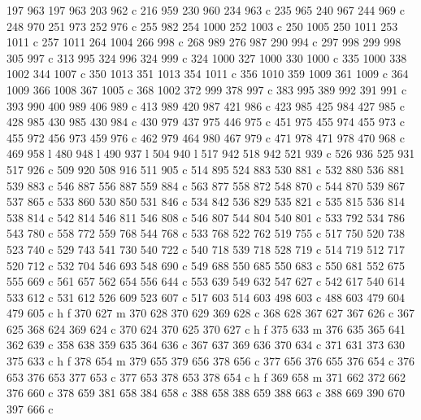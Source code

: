 {{        197 963 197 963 203 962 c
        216 959 230 960 234 963 c
        235 965 240 967 244 969 c
        248 970 251 973 252 976 c
        255 982 254 1000 252 1003 c
        250 1005 250 1011 253 1011 c
        257 1011 264 1004 266 998 c
        268 989 276 987 290 994 c
        297 998 299 998 305 997 c
        313 995 324 996 324 999 c
        324 1000 327 1000 330 1000 c
        335 1000 338 1002 344 1007 c
        350 1013 351 1013 354 1011 c
        356 1010 359 1009 361 1009 c
        364 1009 366 1008 367 1005 c
        368 1002 372 999 378 997 c
        383 995 389 992 391 991 c
        393 990 400 989 406 989 c
        413 989 420 987 421 986 c
        423 985 425 984 427 985 c
        428 985 430 985 430 984 c
        430 979 437 975 446 975 c
        451 975 455 974 455 973 c
        455 972 456 973 459 976 c
        462 979 464 980 467 979 c
        471 978 471 978 470 968 c
        469 958 l
        480 948 l
        490 937 l
        504 940 l
        517 942 518 942 521 939 c
        526 936 525 931 517 926 c
        509 920 508 916 511 905 c
        514 895 524 883 530 881 c
        532 880 536 881 539 883 c
        546 887 556 887 559 884 c
        563 877 558 872 548 870 c
        544 870 539 867 537 865 c
        533 860 530 850 531 846 c
        534 842 536 829 535 821 c
        535 815 536 814 538 814 c
        542 814 546 811 546 808 c
        546 807 544 804 540 801 c
        533 792 534 786 543 780 c
        558 772 559 768 544 768 c
        533 768 522 762 519 755 c
        517 750 520 738 523 740 c
        529 743 541 730 540 722 c
        540 718 539 718 528 719 c
        514 719 512 717 520 712 c
        532 704 546 693 548 690 c
        549 688 550 685 550 683 c
        550 681 552 675 555 669 c
        561 657 562 654 556 644 c
        553 639 549 632 547 627 c
        542 617 540 614 533 612 c
        531 612 526 609 523 607 c
        517 603 514 603 498 603 c
        488 603 479 604 479 605 c
        h f
        370 627 m
        370 628 370 629 369 628 c
        368 628 367 627 367 626 c
        367 625 368 624 369 624 c
        370 624 370 625 370 627 c
        h f
        375 633 m
        376 635 365 641 362 639 c
        358 638 359 635 364 636 c
        367 637 369 636 370 634 c
        371 631 373 630 375 633 c
        h f
        378 654 m
        379 655 379 656 378 656 c
        377 656 376 655 376 654 c
        376 653 376 653 377 653 c
        377 653 378 653 378 654 c
        h f
        369 658 m
        371 662 372 662 376 660 c
        378 659 381 658 384 658 c
        388 658 388 659 388 663 c
        388 669 390 670 397 666 c
}}

